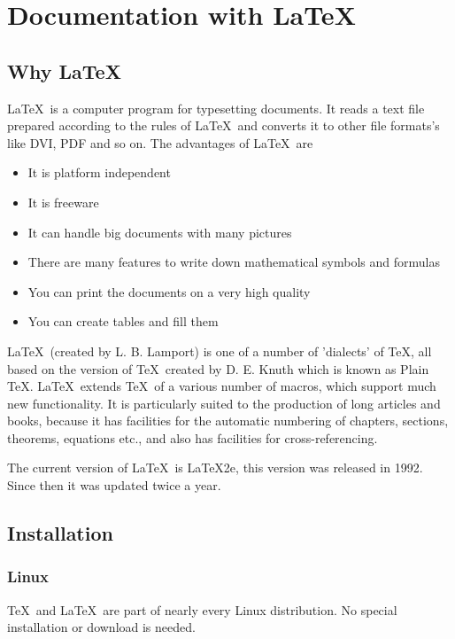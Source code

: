 
\chapter{Documentation with \LaTeX}



\section{Why \LaTeX}

\LaTeX\ is a computer program for typesetting documents.  It
reads a text file prepared according to the rules of
\LaTeX\, and converts it to other file formats's like DVI, PDF and so on.
The advantages of \LaTeX\ are
\begin{itemize}
\item It is platform independent
\item It is freeware
\item It can handle big documents with many pictures
\item There are many features to write down mathematical symbols and formulas
\item You can print the documents on a very high quality
\item You can create tables and fill them
\end{itemize}

\LaTeX\ (created by L. B. Lamport) is one of a number of 'dialects' of \TeX, all based on the version of \TeX\ created by D. E. Knuth which is known as Plain \TeX.
\LaTeX\ extends \TeX\ of a various number of macros, which support much new functionality.
It is particularly suited to the production of long articles and books, because it has
facilities for the automatic numbering of chapters, sections, theorems, equations etc.,
and also has facilities for cross-referencing.

The current version of \LaTeX\ is \LaTeX2e, this version was released in 1992. Since then it was updated twice a year.

\newpage


\section{Installation}

\subsection{Linux}

\TeX\ and \LaTeX\ are part of nearly every Linux distribution.
No special installation or download is needed.

